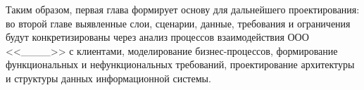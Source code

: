 Таким образом, первая глава формирует основу для дальнейшего проектирования: во второй главе выявленные слои, сценарии, данные, требования и ограничения будут конкретизированы через анализ процессов взаимодействия ООО <<\_\_\_\_>> с клиентами, моделирование бизнес-процессов, формирование функциональных и нефункциональных требований, проектирование архитектуры и структуры данных информационной системы.

